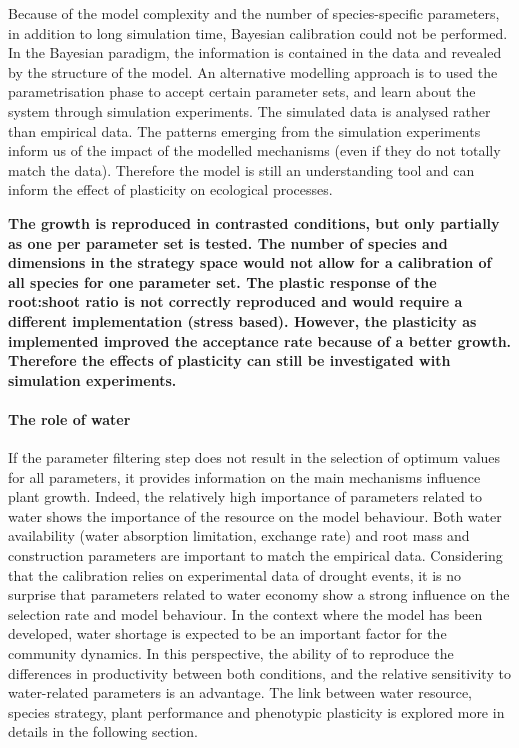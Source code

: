 Because of the model complexity and the number of species-specific parameters, in addition to long simulation time, Bayesian calibration could not be performed. In the Bayesian paradigm, the information is contained in the data and revealed by the structure of the model. An alternative modelling approach is to used the parametrisation phase to accept certain parameter sets, and learn about the system through simulation experiments. The simulated data is analysed rather than empirical data. The patterns emerging from the simulation experiments inform us of the impact of the modelled mechanisms (even if they do not totally match the data). Therefore the model is still an understanding tool and can inform the effect of plasticity on ecological processes.


\textbf{The growth is reproduced in contrasted conditions, but only partially as one per parameter set is tested. The number of species and dimensions in the strategy space would not allow for a calibration of all species for one parameter set. The plastic response of the root:shoot ratio is not correctly reproduced and would require a different implementation (stress based). However, the plasticity as implemented improved the acceptance rate because of a better growth. Therefore the effects of plasticity can still be investigated with simulation experiments.}

\paragraph{The role of water}

If the parameter filtering step does not result in the selection of optimum values for all parameters, it provides information on the main mechanisms influence plant growth. Indeed, the relatively high importance of parameters related to water shows the importance of the resource on the model behaviour. Both water availability (water absorption limitation, exchange rate) and root mass and construction parameters are important to match the empirical data. Considering that the calibration relies on experimental data of drought events, it is no surprise that parameters related to water economy show a strong influence on the selection rate and model behaviour. In the context where the model has been developed, water shortage is expected to be an important factor for the community dynamics. In this perspective, the ability of \model to reproduce the differences in productivity between both conditions, and the relative sensitivity to water-related parameters is an advantage. The link between water resource, species strategy, plant performance and phenotypic plasticity is explored more in details in the following section.



